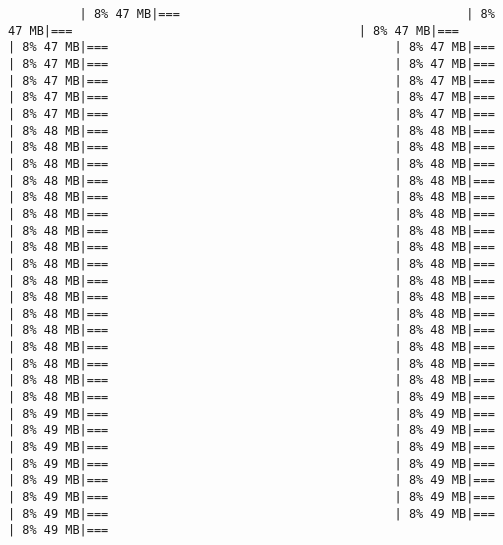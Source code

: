 \documentclass[
]{article}
\begin{document}
\begin{verbatim}
          | 8% 47 MB|===                                        | 8% 47 MB|===                                        | 8% 47 MB|===                                        | 8% 47 MB|===                                        | 8% 47 MB|===                                        | 8% 47 MB|===                                        | 8% 47 MB|===                                        | 8% 47 MB|===                                        | 8% 47 MB|===                                        | 8% 47 MB|===                                        | 8% 47 MB|===                                        | 8% 47 MB|===                                        | 8% 47 MB|===                                        | 8% 48 MB|===                                        | 8% 48 MB|===                                        | 8% 48 MB|===                                        | 8% 48 MB|===                                        | 8% 48 MB|===                                        | 8% 48 MB|===                                        | 8% 48 MB|===                                        | 8% 48 MB|===                                        | 8% 48 MB|===                                        | 8% 48 MB|===                                        | 8% 48 MB|===                                        | 8% 48 MB|===                                        | 8% 48 MB|===                                        | 8% 48 MB|===                                        | 8% 48 MB|===                                        | 8% 48 MB|===                                        | 8% 48 MB|===                                        | 8% 48 MB|===                                        | 8% 48 MB|===                                        | 8% 48 MB|===                                        | 8% 48 MB|===                                        | 8% 48 MB|===                                        | 8% 48 MB|===                                        | 8% 48 MB|===                                        | 8% 48 MB|===                                        | 8% 48 MB|===                                        | 8% 48 MB|===                                        | 8% 48 MB|===                                        | 8% 48 MB|===                                        | 8% 48 MB|===                                        | 8% 48 MB|===                                        | 8% 48 MB|===                                        | 8% 48 MB|===                                        | 8% 49 MB|===                                        | 8% 49 MB|===                                        | 8% 49 MB|===                                        | 8% 49 MB|===                                        | 8% 49 MB|===                                        | 8% 49 MB|===                                        | 8% 49 MB|===                                        | 8% 49 MB|===                                        | 8% 49 MB|===                                        | 8% 49 MB|===                                        | 8% 49 MB|===                                        | 8% 49 MB|===                                        | 8% 49 MB|===                                        | 8% 49 MB|===                                        | 8% 49 MB|===                                        | 8% 49 MB|=== 
\end{verbatim}
\end{document}
